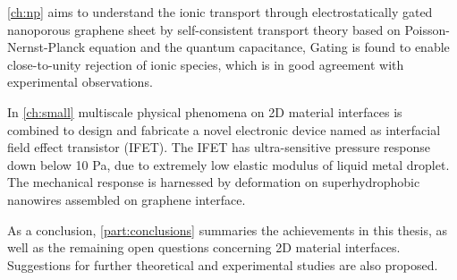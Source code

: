 \autoref{ch:np} aims to understand the ionic transport through
electrostatically gated nano\-porous graphene sheet by
self-consistent transport theory based on Poisson-Nernst-Planck
equation and the quantum capacitance, Gating is found to enable
close-to-unity rejection of ionic species, which is in good agreement
with experimental observations.
%

In \autoref{ch:small} multiscale physical phenomena on 2D material
interfaces is combined to design and fabricate a novel electronic
device named as interfacial field effect transistor (IFET). The IFET
has ultra-sensitive pressure response down below 10 Pa, due to extremely
low elastic modulus of liquid metal droplet. The mechanical response
is harnessed by deformation on superhydrophobic nanowires assembled on
graphene interface.

As a conclusion, \autoref{part:conclusions} summaries the achievements
in this thesis, as well as the remaining open questions concerning 2D
material interfaces. Suggestions for further theoretical and
experimental studies are also proposed.


